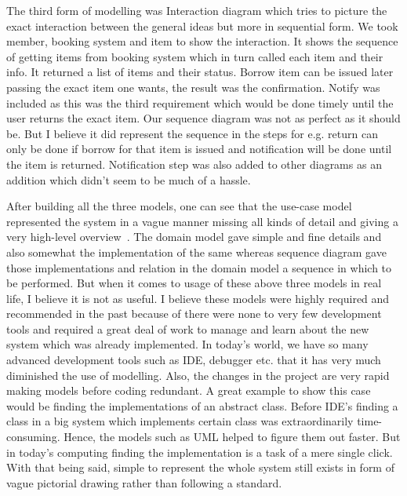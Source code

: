 The third form of modelling was Interaction diagram which tries to picture the exact interaction between the general ideas but more in sequential form. We took member, booking system and item to show the interaction. It shows the sequence of getting items from booking system which in turn called each item and their info. It returned a list of items and their status. Borrow item can be issued later passing the exact item one wants, the result was the confirmation. Notify was included as this was the third requirement which would be done timely until the user returns the exact item. Our sequence diagram was not as perfect as it should be. But I believe it did represent the sequence in the steps for e.g. return can only be done if borrow for that item is issued and notification will be done until the item is returned. Notification step was also added to other diagrams as an addition which didn't seem to be much of a hassle. 

After building all the three models, one can see that the use-case model represented the system in a vague manner missing all kinds of detail and giving a very high-level overview~\cite{dobing2006uml}. The domain model gave simple and fine details and also somewhat the implementation of the same whereas sequence diagram gave those implementations and relation in the domain model a sequence in which to be performed. But when it comes to usage of these above three models in real life, I believe it is not as useful. I believe these models were highly required and recommended in the past because of there were none to very few development tools and required a great deal of work to manage and learn about the new system which was already implemented. In today's world, we have so many advanced development tools such as IDE, debugger etc. that it has very much diminished the use of modelling. Also, the changes in the project are very rapid making models before coding redundant. A great example to show this case would be finding the implementations of an abstract class. Before IDE's finding a class in a big system which implements certain class was extraordinarily time-consuming. Hence, the models such as UML helped to figure them out faster. But in today's computing finding the implementation is a task of a mere single click. With that being said, simple to represent the whole system still exists in form of vague pictorial drawing rather than following a standard.

